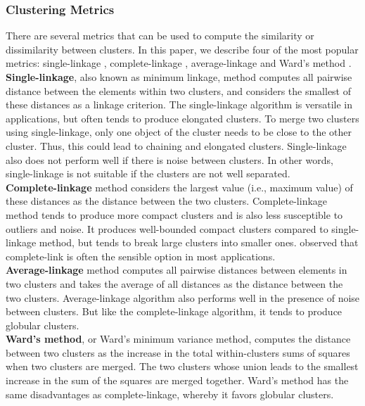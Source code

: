 \subsubsection{Clustering Metrics}

There are several metrics that can be used to compute the similarity or dissimilarity between clusters. In this paper, we describe four of the most popular metrics: single-linkage \cite{sneath_numerical_1973}, complete-linkage \cite{king_step-wise_1967}, average-linkage \cite{eslr} and Ward's method \cite{murtagh_survey_1983, ward_hierarchical_1963}. \\

\textbf{Single-linkage}, also known as minimum linkage, method computes all pairwise distance between the elements within two clusters, and considers the smallest of these distances as a linkage criterion. The single-linkage algorithm is versatile in applications, but often tends to produce elongated clusters. To merge two clusters using single-linkage, only one object of the cluster needs to be close to the other cluster. Thus, this could lead to chaining and elongated clusters. Single-linkage also does not perform well if there is noise between clusters. In other words, single-linkage is not suitable if the clusters are not well separated. \\

\textbf{Complete-linkage} method considers the largest value (i.e., maximum value) of these distances as the distance between the two clusters. Complete-linkage method tends to produce more compact clusters and is also less susceptible to outliers and noise. It produces well-bounded compact clusters compared to single-linkage method, but tends to break large clusters into smaller ones. \cite{Jain1988} observed that complete-link is often the sensible option in most applications. \\

\textbf{Average-linkage} method computes all pairwise distances between elements in two clusters and takes the average of all distances as the distance between the two clusters. Average-linkage algorithm also performs well in the presence of noise between clusters. But like the complete-linkage algorithm, it tends to produce globular clusters. \\

\textbf{Ward's method}, or Ward's minimum variance method, computes the distance between two clusters as the increase in the total within-clusters sums of squares when two clusters are merged. The two clusters whose union leads to the smallest increase in the sum of the squares are merged together. Ward's method has the same disadvantages as complete-linkage, whereby it favors globular clusters. \\

